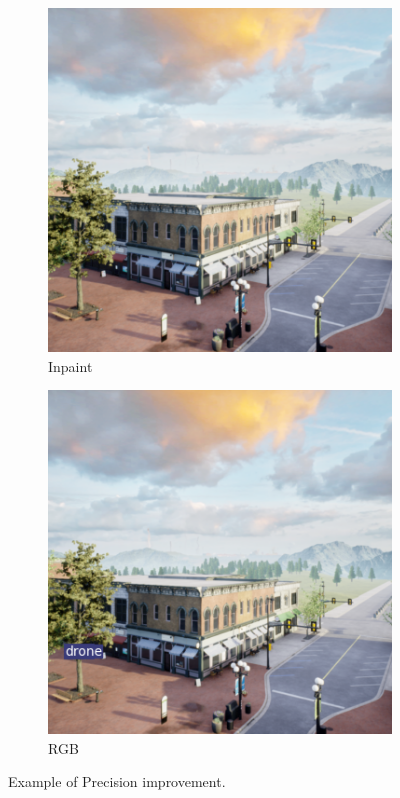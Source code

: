 \documentclass[twoside]{ctuthesis}
\theoremstyle{plain}
\theoremstyle{definition}
\theoremstyle{note}
\begin{document}
\begin{figure}[h!]
	\centering
	\begin{subfigure}[b]{0.4\textwidth}
		\centering
		\includegraphics[width=\textwidth]{02001_inpaint.png}
		\caption{Inpaint}
	\end{subfigure}
	\hfill
	\begin{subfigure}[b]{0.4\textwidth}
		\centering
		\includegraphics[width=\textwidth]{02001_rgb.png}
		\caption{RGB}
	\end{subfigure}
	\caption{Example of Precision improvement.}
\end{figure}


\end{document}
